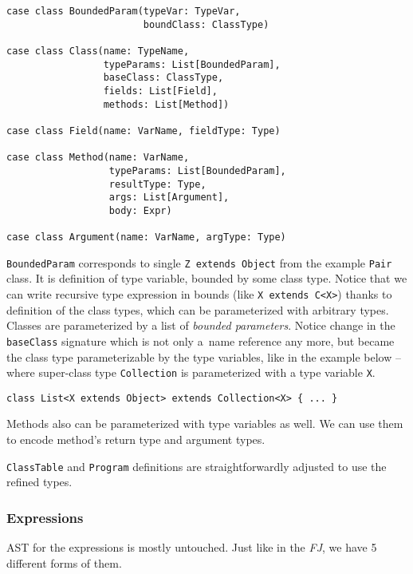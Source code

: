 \documentclass{article}[12pt]
\begin{document}
\begin{verbatim}
case class BoundedParam(typeVar: TypeVar,
                        boundClass: ClassType)

case class Class(name: TypeName,
                 typeParams: List[BoundedParam],
                 baseClass: ClassType,
                 fields: List[Field],
                 methods: List[Method])

case class Field(name: VarName, fieldType: Type)

case class Method(name: VarName,
                  typeParams: List[BoundedParam],
                  resultType: Type,
                  args: List[Argument],
                  body: Expr)
                  
case class Argument(name: VarName, argType: Type)
\end{verbatim}

\texttt{BoundedParam} corresponds to single
\texttt{Z extends Object} from the example \texttt{Pair} class.
It is definition
of type variable, bounded by some class type. Notice that we
can write recursive type expression in bounds
(like \texttt{X extends C<X>}) thanks to definition of the class
types, which can be parameterized with arbitrary types.
Classes are parameterized by a list of \emph{bounded parameters}.
Notice change in the \texttt{baseClass} signature which is not
only a~name reference any more, but became the class type
parameterizable by the type variables, like in the example below --
where super-class type \texttt{Collection} is parameterized with
a type variable \texttt{X}.

\begin{verbatim}
class List<X extends Object> extends Collection<X> { ... }
\end{verbatim}

Methods also can be parameterized with type variables as well.
We can use them to encode method's return type and argument
types.

\texttt{ClassTable} and \texttt{Program} definitions are
straightforwardly adjusted to use the refined types.

\subsubsection{Expressions}

AST for the expressions is mostly untouched. Just like in
the \emph{FJ}, we have 5 different forms of them.
\end{document}
